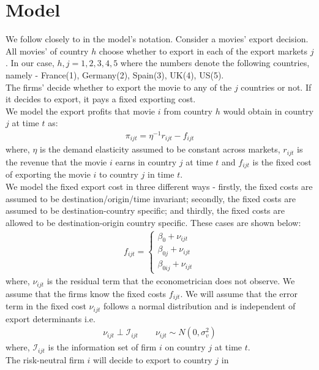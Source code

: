 \documentclass[11pt, letterpaper]{article} \usepackage{amsmath}
\begin{document}
\section{Model}
We follow closely to \citep{dickstein2018} in the model's
notation. Consider a movies' export decision. All movies' of country
$h$ choose whether to export in each of the export markets $j$. In our
case, $h,j=1,2,3,4,5$ where the numbers denote the following
countries, namely - France(1), Germany(2), Spain(3), UK(4), US(5).\\
The firms' decide whether to export the movie to any of the $j$
countries or not. If it decides to export, it pays a fixed exporting
cost. \\
We model the export profits that movie $i$ from country $h$ would
obtain in country $j$ at time $t$ as:
\begin{align*}
  \pi_{ijt} = \eta^{-1}r_{ijt} - f_{ijt}
\end{align*}
where, $\eta$ is the demand elasticity assumed to be constant across
markets, $r_{ijt}$ is the revenue that the movie $i$ earns in country
$j$ at time $t$ and $f_{ijt}$ is the fixed cost of exporting the movie
$i$ to country $j$ in time $t$. \\
We model the fixed export cost in three different ways - firstly, the
fixed costs are assumed to be destination/origin/time invariant;
secondly, the fixed costs are assumed to be destination-country
specific; and thirdly, the fixed costs are allowed to be
destination-origin country specific. These cases are shown below:
\begin{align*}
  f_{ijt} = \begin{cases}
    \beta_0 + \nu_{ijt}\\
    \beta_{0j} + \nu_{ijt}\\
    \beta_{0ij} + \nu_{ijt}
  \end{cases}
\end{align*}
where, $\nu_{ijt}$ is the residual term that the econometrician does
not observe. We assume that the firms know the fixed costs $f_{ijt}$.
We will assume that the error term in the fixed cost $\nu_{ijt}$
follows a normal distribution and is independent of export
determinants i.e.
\begin{align*}
  \nu_{ijt} \perp \mathcal{I}_{ijt} \qquad \nu_{ijt} \sim N(0, \sigma_v^2)
\end{align*}
where, $\mathcal{I}_{ijt}$ is the information set of firm $i$ on
country $j$ at time $t$.\\
The risk-neutral firm $i$ will decide to export to country $j$ in
\end{document}

